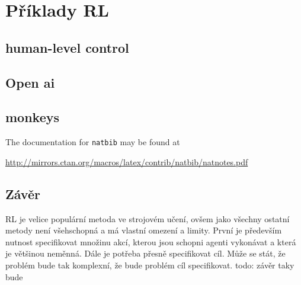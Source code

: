 \documentclass{article}
\begin{document}
\section{Příklady RL}
\label{sec:priklady}

\subsection{human-level control}
\cite{mnih2015human}
\subsection{Open ai}
\cite{openAI}
\cite{baker2019emergent}
\subsection{monkeys}
\label{monkey}
 \cite{monkeyExp}
 \cite{hamel1996competing}

The documentation for \verb+natbib+ may be found at
\begin{center}
  \url{http://mirrors.ctan.org/macros/latex/contrib/natbib/natnotes.pdf}
\end{center}


\subsection{Závěr}
RL je velice populární metoda ve strojovém učení, ovšem jako všechny ostatní metody není všehschopná a má vlastní omezení a limity. První je především nutnost specifikovat množinu akcí, kterou jsou schopni agenti vykonávat a která je většinou neměnná. Dále je potřeba přesně specifikovat cíl. Může se stát, že problém bude tak komplexní, že bude problém cíl specifikovat.
todo: závěr taky bude 


  
  
\end{document}
